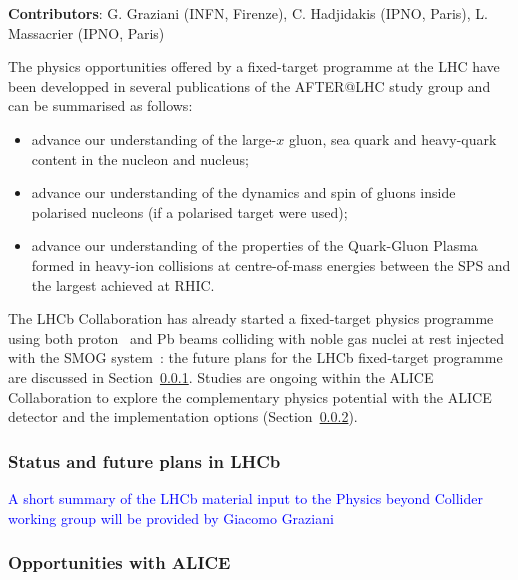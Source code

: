 \documentclass[../report.tex]{subfiles}
\begin{document}
\textbf{Contributors}: G. Graziani (INFN, Firenze), C. Hadjidakis (IPNO, Paris), L. Massacrier (IPNO, Paris)

The physics opportunities offered by a fixed-target programme at the LHC have been developped in several publications of the AFTER@LHC study group \cite{Brodsky:2012vg, Lansberg:Adv2015} and can be summarised as follows:
\begin{itemize}
\item advance our understanding of the large-$x$ gluon, sea quark and heavy-quark content in the nucleon and nucleus;
\item advance our understanding of the dynamics and spin of gluons inside polarised nucleons (if a polarised target were used);
\item advance our understanding of the properties of the Quark-Gluon Plasma formed in heavy-ion collisions at centre-of-mass energies between the SPS and the largest achieved at RHIC.
\end{itemize}
The LHCb Collaboration has already started a fixed-target physics programme using both proton~\cite{Aaij:2018svt,Aaij:2018ogq} and Pb beams colliding with noble gas nuclei at rest injected with the SMOG system~\cite{SMOG}: the future plans for the LHCb fixed-target programme are discussed in Section~\ref{sec:FTLHCb}. Studies are ongoing within the ALICE Collaboration to explore the complementary physics potential with the ALICE detector and the implementation options (Section~\ref{sec:FTALICE}). 

\subsubsection{Status and future plans in LHCb}
\label{sec:FTLHCb}

\textcolor{blue}{A short summary of the LHCb material input to the Physics beyond Collider working group will be provided by Giacomo Graziani}

\subsubsection{Opportunities with ALICE}
\label{sec:FTALICE}
\end{document}
